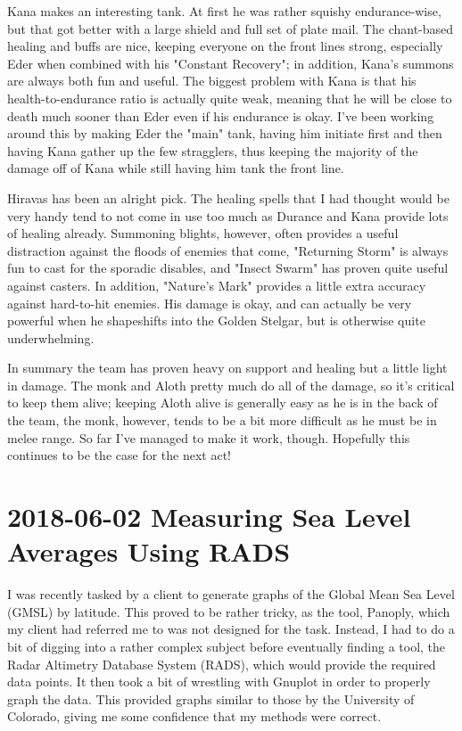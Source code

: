 \documentclass{article}
\begin{document}
Kana makes an interesting tank.  At first he was rather squishy endurance-wise, but that got better with a large shield and full set of plate mail.  The chant-based healing and buffs are nice, keeping everyone on the front lines strong, especially Eder when combined with his "Constant Recovery"; in addition, Kana's summons are always both fun and useful.  The biggest problem with Kana is that his health-to-endurance ratio is actually quite weak, meaning that he will be close to death much sooner than Eder even if his endurance is okay.  I've been working around this by making Eder the "main" tank, having him initiate first and then having Kana gather up the few stragglers, thus keeping the majority of the damage off of Kana while still having him tank the front line.

Hiravas has been an alright pick.  The healing spells that I had thought would be very handy tend to not come in use too much as Durance and Kana provide lots of healing already.  Summoning blights, however, often provides a useful distraction against the floods of enemies that come, "Returning Storm" is always fun to cast for the sporadic disables, and "Insect Swarm" has proven quite useful against casters.  In addition, "Nature's Mark" provides a little extra accuracy against hard-to-hit enemies.  His damage is okay, and can actually be very powerful when he shapeshifts into the Golden Stelgar, but is otherwise quite underwhelming.

In summary the team has proven heavy on support and healing but a little light in damage.  The monk and Aloth pretty much do all of the damage, so it's critical to keep them alive; keeping Aloth alive is generally easy as he is in the back of the team, the monk, however, tends to be a bit more difficult as he must be in melee range.  So far I've managed to make it work, though.  Hopefully this continues to be the case for the next act!


\section{2018-06-02 Measuring Sea Level Averages Using RADS}
I was recently tasked by a client to generate graphs of the Global Mean Sea Level (GMSL) by latitude.  This proved to be rather tricky, as the tool, Panoply, which my client had referred me to was not designed for the task.  Instead, I had to do a bit of digging into a rather complex subject before eventually finding a tool, the Radar Altimetry Database System (RADS), which would provide the required data points.  It then took a bit of wrestling with Gnuplot in order to properly graph the data.  This provided graphs similar to those  by the University of Colorado, giving me some confidence that my methods were correct.
\end{document}
